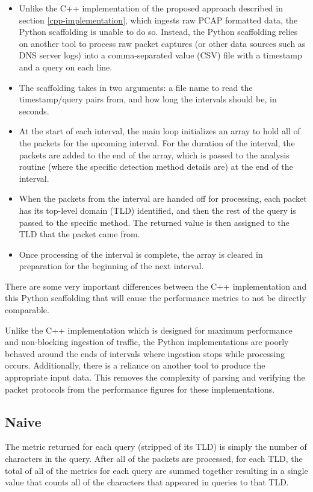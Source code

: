 \documentclass[12pt]{report}
\theoremstyle{remark}
\theoremstyle{definition}
\theoremstyle{definition}
\theoremstyle{definition}
\begin{document}
\begin{itemize} \item Unlike the C++ implementation of the proposed approach
described in section \ref{cpp-implementation}, which ingests raw PCAP formatted
data, the Python scaffolding is unable to do so. Instead, the Python scaffolding
relies on another tool to process raw packet captures (or other data sources
such as DNS server logs) into a comma-separated value (CSV) file with a
timestamp and a query on each line.

\item The scaffolding takes in two arguments: a file name to read the
timestamp/query pairs from, and how long the intervals should be, in seconds.

\item At the start of each interval, the main loop initializes an array to hold
all of the packets for the upcoming interval. For the duration of the interval,
the packets are added to the end of the array, which is passed to the analysis
routine (where the specific detection method details are) at the end of the
interval.

\item When the packets from the interval are handed off for processing, each
packet has its top-level domain (TLD) identified, and then the rest of the query
is passed to the specific method. The returned value is then assigned to the TLD
that the packet came from.

\item Once processing of the interval is complete, the array is cleared in
preparation for the beginning of the next interval.

\end{itemize}

There are some very important differences between the C++ implementation and
this Python scaffolding that will cause the performance metrics to not be
directly comparable.

Unlike the C++ implementation which is designed for maximum performance and
non-blocking ingestion of traffic, the Python implementations are poorly behaved
around the ends of intervals where ingestion stops while processing occurs.
Additionally, there is a reliance on another tool to produce the appropriate 
input data. This removes the complexity of
parsing and verifying the packet protocols from the performance figures for
these implementations.

\subsection{Naive}
\label{implementation-naive}
The metric returned for each query (stripped of its TLD) is simply the number of
characters in the query. After all of the packets are processed, for each TLD,
the total of all of the metrics for each query are summed together resulting in
a single value that counts all of the characters that appeared in queries to
that TLD.
\end{document}
